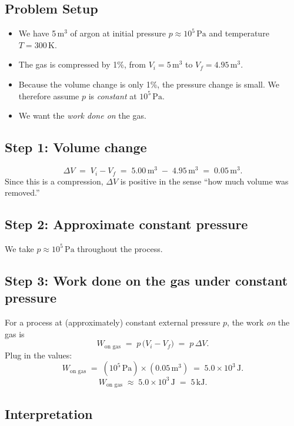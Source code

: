 \documentclass[12pt]{article}
\theoremstyle{definition} %
\theoremstyle{plain} %
\begin{document}
\subsection*{Problem Setup}
\begin{itemize}
  \item We have 5\,m\(^3\) of argon at initial pressure $p \approx 10^5\,\mathrm{Pa}$ and temperature $T=300\,\mathrm{K}$.
  \item The gas is compressed by 1\%, from $V_i = 5\,\mathrm{m}^3$ to $V_f = 4.95\,\mathrm{m}^3$.
  \item Because the volume change is only 1\%, the pressure change is small. We therefore assume $p$ is \emph{constant} at $10^5\,\mathrm{Pa}$.
  \item We want the \emph{work done on} the gas.
\end{itemize}

\subsection*{Step 1: Volume change}

\[
\Delta V 
\;=\; 
V_i - V_f
\;=\; 
5.00\,\mathrm{m}^3 \;-\; 4.95\,\mathrm{m}^3
\;=\;
0.05\,\mathrm{m}^3.
\]
Since this is a compression, $\Delta V$ is positive in the sense ``how much volume was removed.''

\subsection*{Step 2: Approximate constant pressure}

We take $p \approx 10^5\,\mathrm{Pa}$ throughout the process.  

\subsection*{Step 3: Work done on the gas under constant pressure}

For a process at (approximately) constant external pressure $p$, the work \emph{on} the gas is
\[
W_{\text{on gas}}
\;=\;
p \,\bigl(V_i - V_f\bigr)
\;=\;
p\,\Delta V.
\]
Plug in the values:
\[
W_{\text{on gas}}
\;=\;
(10^5 \,\mathrm{Pa})
\times
(0.05\,\mathrm{m}^3)
\;=\;
5.0 \times 10^3\,\mathrm{J}.
\]
\[
\boxed{
W_{\text{on gas}}
\;\approx\;
5.0 \times 10^3\,\mathrm{J}
\;=\;
5\,\mathrm{kJ}.
}
\]

\subsection*{Interpretation}
\end{document}
